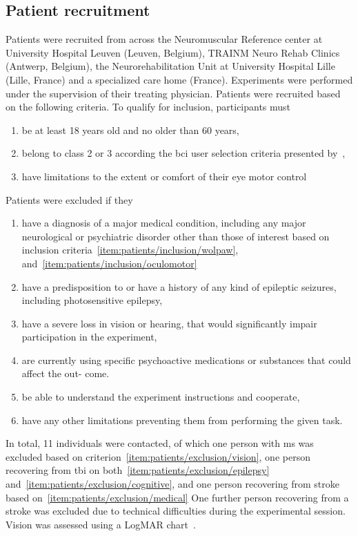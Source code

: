 \subsection{Patient recruitment}
Patients were recruited from across the Neuromuscular Reference center at
University Hospital Leuven (Leuven, Belgium), TRAINM Neuro Rehab Clinics
(Antwerp, Belgium), the Neurorehabilitation Unit at University Hospital Lille
(Lille, France) and a specialized care home (France).
Experiments were performed under the supervision of their treating physician.
Patients were recruited based on the following criteria.
To qualify for inclusion, participants must
\begin{enumerate}
	\item be at least 18 years old and no older than 60
	years,
  \item belong to class 2 or 3 according the \ac{bci}	user selection criteria
    presented by~\textcite{Wolpaw2006},\label{item:patients/inclusion/wolpaw}
  \item have limitations to the extent or comfort of their eye motor control\label{item:patients/inclusion/oculomotor}
\end{enumerate}
Patients were excluded if they
\begin{enumerate}
  \item have a diagnosis of a major medical condition, including any major
    neurological or psychiatric disorder other than those of interest based on
    inclusion criteria~\ref{item:patients/inclusion/wolpaw},
    and~\ref{item:patients/inclusion/oculomotor}\label{item:patients/exclusion/medical}
  \item have a predisposition to or have a history of any kind of epileptic seizures,
    including photosensitive epilepsy,\label{item:patients/exclusion/epilepsy}
  \item have a severe loss in vision or hearing, that would significantly impair
        participation in the experiment,\label{item:patients/exclusion/vision}
  \item are currently using specific psychoactive medications or substances that could affect the out-
        come.\label{item:patients/exclusion/cognitive}
  \item be able to understand the experiment instructions and cooperate,
  \item have any other limitations preventing them from performing the given task.
\end{enumerate}

In total, 11 individuals were contacted, of which one person with \ac{ms} was excluded based on
criterion~\ref{item:patients/exclusion/vision}, one person recovering from
\ac{tbi} on
both~\ref{item:patients/exclusion/epilepsy}
and~\ref{item:patients/exclusion/cognitive}, and one person recovering from
stroke based
on~\ref{item:patients/exclusion/medical}
One further person recovering from a stroke was excluded due to technical
difficulties during the experimental session.
Vision was assessed using a LogMAR chart~\cite{Bailey1976}.

